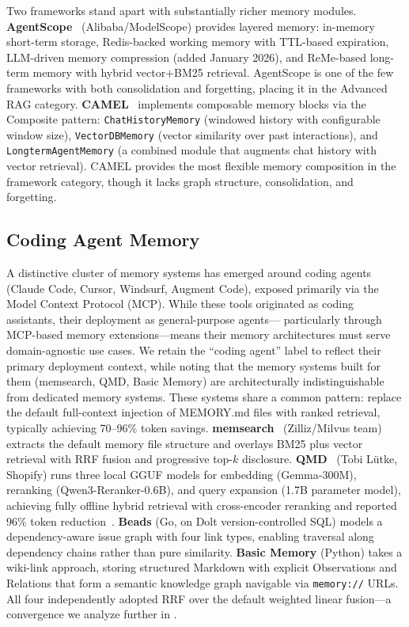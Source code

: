 Two frameworks stand apart with substantially richer memory modules.
\textbf{AgentScope}~\cite{agentscope2025} (Alibaba/ModelScope) provides
layered memory: in-memory short-term storage, Redis-backed working memory
with TTL-based expiration, LLM-driven memory compression (added January
2026), and ReMe-based long-term memory with hybrid vector+BM25 retrieval.
AgentScope is one of the few frameworks with both consolidation and
forgetting, placing it in the Advanced RAG category.
\textbf{CAMEL}~\cite{camel2025} implements composable memory blocks via
the Composite pattern: \texttt{ChatHistoryMemory} (windowed history with
configurable window size), \texttt{VectorDBMemory} (vector similarity
over past interactions), and \texttt{LongtermAgentMemory} (a combined
module that augments chat history with vector retrieval).  CAMEL provides
the most flexible memory composition in the framework category, though
it lacks graph structure, consolidation, and forgetting.

\subsection{Coding Agent Memory}
\label{sec:coding-agents}

A distinctive cluster of memory systems has emerged around coding
agents (Claude Code, Cursor, Windsurf, Augment Code), exposed primarily
via the Model Context Protocol (MCP).  While these tools originated as
coding assistants, their deployment as general-purpose agents---
particularly through MCP-based memory extensions---means their memory
architectures must serve domain-agnostic use cases.  We retain the
``coding agent'' label to reflect their primary deployment context, while
noting that the memory systems built for them (memsearch, QMD, Basic
Memory) are architecturally indistinguishable from dedicated memory
systems.  These systems share a common pattern:
replace the default full-context injection of MEMORY.md files with
ranked retrieval, typically achieving 70--96\% token savings.
\textbf{memsearch}~\cite{zilliz2026a} (Zilliz/Milvus team) extracts
the default memory file structure and overlays BM25 plus vector
retrieval with RRF fusion and progressive top-$k$ disclosure.
\textbf{QMD}~\cite{lutke2026qmd} (Tobi L\"utke, Shopify) runs three
local GGUF models for embedding (Gemma-300M), reranking
(Qwen3-Reranker-0.6B), and query expansion (1.7B parameter model),
achieving fully offline hybrid retrieval with cross-encoder reranking
and reported 96\% token reduction~\cite{levine2026}. \textbf{Beads}
(Go, on Dolt version-controlled SQL) models a dependency-aware issue
graph with four link types, enabling traversal along dependency chains
rather than pure similarity. \textbf{Basic Memory} (Python) takes a
wiki-link approach, storing structured Markdown with explicit
Observations and Relations that form a semantic knowledge graph
navigable via \texttt{memory://} URLs. All four independently adopted
RRF over the default weighted linear fusion---a convergence we
analyze further in .

